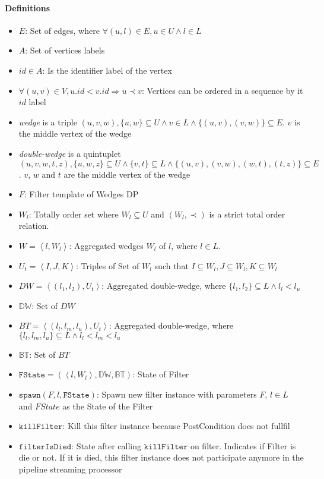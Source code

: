 \documentclass[12pt, a4paper]{article}
\newcommand{\dw}{\mathbb{DW}}
\newcommand{\bt}{\mathbb{BT}}
\newcommand{\st}{\mathtt{FState}}
\newcommand{\sw}{\mathtt{spawn}}
\newcommand{\fd}{\mathtt{killFilter}}
\newcommand{\fid}{\mathtt{filterIsDied}}
\newcommand{\la}{\left\langle}
\newcommand{\ra}{\right\rangle}
\begin{document}
\paragraph{Definitions}
\begin{itemize}
      \item $E$: Set of edges, where $\forall (u,l) \in E, u \in U \land l \in L$
      \item $A$: Set of vertices labels
      \item $id \in A$: Is the identifier label of the vertex
      \item $\forall (u,v) \in V, u.id < v.id \Rightarrow u \prec v$: Vertices can be ordered in a sequence by it $id$ label
      \item \textit{wedge} is a triple $(u,v,w), \{u,w\} \subseteq U  \land v \in L \land \{(u,v), (v,w)\} \subseteq E$. $v$ is the middle vertex of the wedge
      \item \textit{double-wedge} is a quintuplet $(u,v,w,t,z), \{u,w,z\} \subseteq U  \land \{v,t\} \subseteq L \land \{(u,v), (v,w), (w, t), (t,z)\} \subseteq E$. 
            $v$, $w$ and $t$ are the middle vertex of the wedge
      \item $F$: Filter template of Wedges DP
      \item $W_l$: Totally order set where $W_l \subseteq U$ and $(W_l, \prec)$ is a strict total order relation.
      \item $W = \la l, W_l \ra$: Aggregated wedges $W_l$ of $l$, where $l \in L$.
      \item $U_t = \la I, J, K \ra$: Triples of Set of $W_l$ such that $I \subseteq W_l, J \subseteq W_l, K \subseteq W_l$
      \item $DW = \la (l_1, l_2), U_t \ra$: Aggregated double-wedge, where $\{l_1, l_2\} \subseteq L \land l_l < l_u$
      \item $\dw$: Set of $DW$
      \item $BT = \la (l_l, l_m, l_u), U_t \ra$: Aggregated double-wedge, where $\{l_l, l_m, l_u\} \subseteq L \land l_l < l_m < l_u$
      \item $\bt$: Set of $BT$
      \item $\st = (\la l, W_l \ra, \dw, \bt)$: State of Filter
      \item $\sw(F,l,\st)$: Spawn new filter instance with parameters $F$, $l \in L$ and $FState$ as the State of the Filter
      \item $\fd$: Kill this filter instance because PostCondition does not fullfil
      \item $\fid$: State after calling $\fd$ on filter. Indicates if Filter is die or not. If it is died, this filter instance does not participate anymore in the pipeline streaming processor

\end{itemize}
\end{document}

